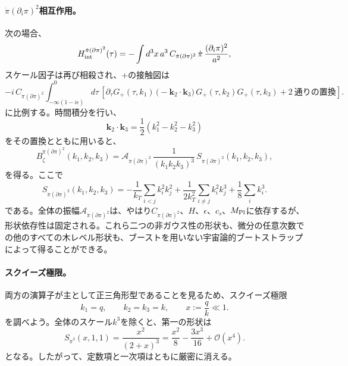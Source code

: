 \documentclass[a4paper,11pt,oneside]{article}
\theoremstyle{definition}
\numberwithin{equation}{section}
\begin{document}
\paragraph{\(\dot\pi(\partial_i\pi)^2\)相互作用。}
次の場合、
\begin{equation}
H_{\rm int}^{\dot\pi(\partial\pi)^2}(\tau)
=
-\int d^3x\,a^3\,
C_{\dot\pi(\partial\pi)^2}\,
\dot\pi\,\frac{(\partial_i\pi)^2}{a^2},
\end{equation}
スケール因子は再び相殺され、\(+\)の接触図は
\begin{equation}
-i\,C_{\dot\pi(\partial\pi)^2}
\int_{-\infty(1-i\epsilon)}^0 d\tau\,
\left[
\partial_\tau G_{+}(\tau,k_1)\,
\bigl(-\mathbf k_2\!\cdot\!\mathbf k_3\bigr)\,
G_{+}(\tau,k_2)G_{+}(\tau,k_3)
+
2\ \text{通りの置換}
\right] .
\end{equation}
に比例する。時間積分を行い、
\begin{equation}
\mathbf k_2\!\cdot\!\mathbf k_3
=
\frac12\left(k_1^2-k_2^2-k_3^2\right)
\end{equation}
をその置換とともに用いると、
\begin{equation}
B_\zeta^{\dot\pi(\partial\pi)^2}(k_1,k_2,k_3)
=
\mathcal A_{\dot\pi(\partial\pi)^2}\,
\frac{1}{(k_1k_2k_3)^3}\,
S_{\dot\pi(\partial\pi)^2}(k_1,k_2,k_3) ,
\end{equation}
を得る。ここで
\begin{equation}
S_{\dot\pi(\partial\pi)^2}(k_1,k_2,k_3)
=
-\frac{1}{k_{T}}\sum_{i<j}k_i^2k_j^2
+\frac{1}{2k_{T}^2}\sum_{i\neq j}k_i^2k_j^3
+\frac18\sum_i k_i^3 .
\end{equation}
である。全体の振幅\(\mathcal A_{\dot\pi(\partial\pi)^2}\)は、やはり\(C_{\dot\pi(\partial\pi)^2}\)、\(H\)、\(\epsilon\)、\(c_s\)、\(M_{\rm Pl}\)に依存するが、形状依存性は固定される。これら二つの非ガウス性の形状も、微分の任意次数での他のすべての木レベル形状も、ブーストを用いない宇宙論的ブートストラップ\cite{Pajer:2020wxk,Jazayeri:2021fvk}によって得ることができる。



\paragraph{スクイーズ極限。}
両方の演算子が主として正三角形型であることを見るため、スクイーズ極限
\begin{equation}
k_1=q,
\qquad
k_2=k_3=k,
\qquad
x:=\frac{q}{k}\ll 1 .
\end{equation}
を調べよう。全体のスケール\(k^3\)を除くと、第一の形状は
\begin{equation}
S_{\dot\pi^3}(x,1,1)
=
\frac{x^2}{(2+x)^3}
=
\frac{x^2}{8}
-\frac{3x^3}{16}
+\mathcal O(x^4) .
\end{equation}
となる。したがって、定数項と一次項はともに厳密に消える。
\end{document}
